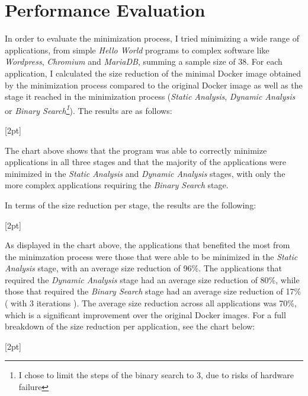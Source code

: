 \chapter{Performance Evaluation}
\label{chapter:performance-evaluation}

In order to evaluate the minimization process, I tried minimizing a wide range of applications, from simple \textit{Hello World} programs to complex 
software like \textit{Wordpress}, \textit{Chromium} and \textit{MariaDB}, summing a sample size of 
38. For each application, I calculated the size reduction of the minimal Docker image obtained by the minimization process compared to the 
original Docker image as well as the stage it reached in the minimization process (\textit{Static Analysis}, \textit{Dynamic Analysis} or \textit{Binary Search\footnote{I chose to limit the steps of the binary search to 3, due to risks of hardware failure }}).
The results are as follows:

[2pt]

The chart above shows that the program was able to correctly minimize applications in all three stages and that the majority of the applications were minimized in the 
\textit{Static Analysis} and \textit{Dynamic Analysis} stages, with only the more complex applications requiring the \textit{Binary Search} stage.

In terms of the size reduction per stage, the results are the following:

[2pt]

As displayed in the chart above, the applications that benefited the most from the minimzation process were those that were able to be minimized in the \textit{Static Analysis} stage, with an average size reduction of 96\%. The applications that required the \textit{Dynamic Analysis} stage had an average size reduction of 80\%, while those that required the \textit{Binary Search} stage had an average size reduction of 17\% ( with 3 iterations ).
The average size reduction across all applications was 70\%, which is a significant improvement over the original Docker images.
For a full breakdown of the size reduction per application, see the chart below: 

[2pt]